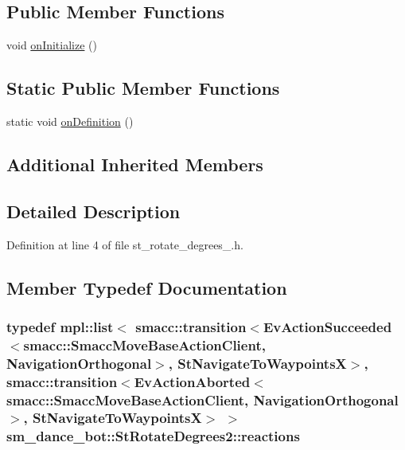\subsection*{Public Member Functions}
\begin{DoxyCompactItemize}
\item 
void \hyperlink{structsm__dance__bot_1_1StRotateDegrees2_af85e79274e57e0a4ccf50845bac9edc9}{on\+Initialize} ()
\end{DoxyCompactItemize}
\subsection*{Static Public Member Functions}
\begin{DoxyCompactItemize}
\item 
static void \hyperlink{structsm__dance__bot_1_1StRotateDegrees2_aebb0e8217cca3669331f049a1382ea4e}{on\+Definition} ()
\end{DoxyCompactItemize}
\subsection*{Additional Inherited Members}


\subsection{Detailed Description}


Definition at line 4 of file st\+\_\+rotate\+\_\+degrees\+\_.\+h.



\subsection{Member Typedef Documentation}
\subsubsection[{\texorpdfstring{reactions}{reactions}}]{\setlength{\rightskip}{0pt plus 5cm}typedef mpl\+::list$<$ {\bf smacc\+::transition}$<$Ev\+Action\+Succeeded$<${\bf smacc\+::\+Smacc\+Move\+Base\+Action\+Client}, {\bf Navigation\+Orthogonal}$>$, {\bf St\+Navigate\+To\+WaypointsX}$>$, {\bf smacc\+::transition}$<$Ev\+Action\+Aborted$<${\bf smacc\+::\+Smacc\+Move\+Base\+Action\+Client}, {\bf Navigation\+Orthogonal}$>$, {\bf St\+Navigate\+To\+WaypointsX}$>$ $>$ {\bf sm\+\_\+dance\+\_\+bot\+::\+St\+Rotate\+Degrees2\+::reactions}}\hypertarget{structsm__dance__bot_1_1StRotateDegrees2_aaa234f0d7e5535f1fda1624a00d037b7}{}\label{structsm__dance__bot_1_1StRotateDegrees2_aaa234f0d7e5535f1fda1624a00d037b7}


